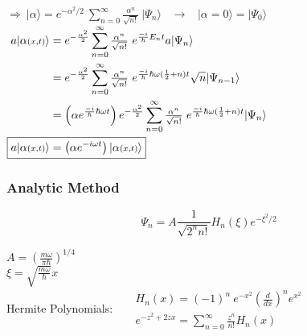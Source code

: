 \documentclass[12pt]{article}
\begin{document}
\begin{minipage}{.5\textwidth}
    \( \displaystyle \Rightarrow \ \boxed{ \big| \alpha \big\rangle 
    = e^{- \alpha^{2} / 2} \ \sum_{n=0}^\infty 
    \tfrac{\alpha^n}{\sqrt{n!}} \ | \Psi_n \rangle } \) 
    \ \(\rightarrow\) \
    \( \big| \alpha {\scriptstyle =} 0 \big\rangle = | \Psi_0 \rangle \)\\[10pt]
    \( \begin{aligned}
        a | \alpha{\scriptstyle(x,t)} \rangle 
            &= e^{- \frac{\alpha^{2}}{2}} \sum_{n=0}^\infty 
            \tfrac{\alpha^n}{\sqrt{n!}} \ e^{\frac{-i}{\hbar} E_n t} a | \Psi_n \rangle\\
        &= e^{- \frac{\alpha^{2}}{2}} \sum_{n=0}^\infty 
            \tfrac{\alpha^n}{\sqrt{n!}} \ e^{\frac{-i}{\hbar} 
            \hbar \omega (\frac{1}{2} + n) t} \sqrt{n} | \Psi_{n-1} \rangle \\
        &= \left( \alpha e^{\frac{-i}{\hbar} \hbar \omega t} \right) e^{- \frac{\alpha^{2}}{2}}
            \sum_{n=0}^\infty \tfrac{\alpha^n}{\sqrt{n!}} \ e^{\frac{-i}{\hbar} 
            \hbar \omega (\frac{1}{2} + n) t} | \Psi_n \rangle\\
        \Aboxed{ a | \alpha{\scriptstyle(x,t)} \rangle 
            &= \left( \alpha e^{-i \omega t} \right) | \alpha{\scriptstyle(x,t)} \rangle }
    \end{aligned} \)
\end{minipage}

\vspace{1cm}

\subsubsection{Analytic Method}

\boldmath \[ \Psi_n = A \frac{1}{\sqrt{2^n n!}} H_n(\xi) e^{- \xi^2 / 2} \] \unboldmath

\vspace{5pt}\noindent
\( A = \left( \frac{m \omega }{\pi \hbar} \right)^{1/4} \) \\[10pt]
\( \xi = \sqrt{ \frac{m \omega }{\hbar} } x\) \\[10pt]
Hermite Polynomials: \ \( \begin{aligned}
    &H_n(x) = (-1)^n \ e^{-x^2} \left( \frac{d}{dx} \right)^n e^{x^2}\\[5pt]
    &e^{-z^2 + 2zx} = \sum_{n=0}^\infty \frac{z^n}{n!} H_n(x)
\end{aligned} \)
\end{document}
